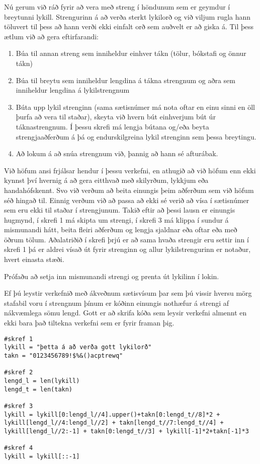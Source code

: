 \begin{exercise}\label{str8}
Nú gerum við ráð fyrir að vera með streng í höndunum sem er geymdur í breytunni lykill.
Strengurinn á að verða sterkt lykilorð og við viljum rugla hann töluvert til þess að hann verði ekki einfalt orð sem auðvelt er að giska á.
Til þess ætlum við að gera eftirfarandi:
\begin{enumerate}
	\item Búa til annan streng sem inniheldur einhver tákn (tölur, bókstafi og önnur tákn)
	\item Búa til breytu sem inniheldur lengdina á tákna strengnum og aðra sem inniheldur lengdina á lykilstrengnum
	\item Búta upp lykil strenginn (sama sætisnúmer má nota oftar en einu sinni en öll þurfa að vera til staðar), skeyta við hvern bút einhverjum bút úr táknastrengnum.
		Í þessu skrefi má lengja bútana og/eða beyta strengjaaðferðum á þá og endurskilgreina lykil strenginn sem þessa breytingu.
	\item Að lokum á að snúa strengnum við, þannig að hann sé afturábak.
\end{enumerate}
\end{exercise}
\begin{Answer}[ref={str8}]
Við höfum ansi frjálsar hendur í þessu verkefni, en athugið að við höfum enn ekki kynnst því hvernig á að gera eitthvað með skilyrðum, lykkjum eða handahófskennt.
Svo við verðum að beita einungis þeim aðferðum sem við höfum séð hingað til.
Einnig verðum við að passa að ekki sé verið að vísa í sætisnúmer sem eru ekki til staðar í strengjunum.
Takið eftir að þessi lausn er einungis hugmynd, í skrefi 1 má skipta um strengi, í skrefi 3 má klippa í sundur á mismunandi hátt, beita fleiri aðferðum og lengja sjaldnar eða oftar eða með öðrum tölum.
Aðalatriðið í skrefi þrjú er að sama hvaða strengir eru settir inn í skrefi 1 þá er aldrei vísað út fyrir strenginn og allur lykilstrengurinn er notaður, hvert einasta stæði.

Prófaðu að setja inn mismunandi strengi og prenta út lykilinn í lokin.

Ef þú leystir verkefnið með ákveðnum sætisvísum þar sem þú vissir hversu mörg stafabil voru í strengnum þínum er kóðinn einungis nothæfur á strengi af nákvæmlega sömu lengd.
Gott er að skrifa kóða sem leysir verkefni almennt en ekki bara það tiltekna verkefni sem er fyrir framan þig.
\begin{lstlisting}
#skref 1
lykill = "þetta á að verða gott lykilorð"
takn = "0123456789!$%&()acptrewq" 

#skref 2 
lengd_l = len(lykill)
lengd_t = len(takn)

#skref 3
lykill = lykill[0:lengd_l//4].upper()+takn[0:lengd_t//8]*2 + lykill[lengd_l//4:lengd_l//2] + takn[lengd_t//7:lengd_t//4] + lykill[lengd_l//2:-1] + takn[0:lengd_t//3] + lykill[-1]*2+takn[-1]*3 

#skref 4
lykill = lykill[::-1]\end{lstlisting}
\end{Answer}